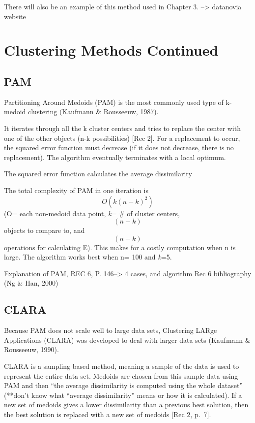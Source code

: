 \documentclass[12pt,twoside]{amherstthesis}
\begin{document}
  There will also be an example of this method used in Chapter 3.
  --\textgreater{} datanovia website
  
  \chapter{Clustering Methods Continued}\label{typeset-equ}
  
  \section{PAM}\label{pam}
  
  Partitioning Around Medoids (PAM) is the most commonly used type of
  k-medoid clustering (Kaufmann \& Rousseeuw, 1987).
  
  It iterates through all the k cluster centers and tries to replace the
  center with one of the other objects (n-k possibilities) {[}Rec 2{]}.
  For a replacement to occur, the squared error function must decrease (if
  it does not decrease, there is no replacement). The algorithm eventually
  terminates with a local optimum.
  
  The squared error function calculates the average dissimilarity
  
  The total complexity of PAM in one iteration is \[O(k(n-k)^2)\] (O= each
  non-medoid data point, \emph{k}= \# of cluster centers, \[(n-k)\]
  objects to compare to, and \[(n-k)\] operations for calculating E). This
  makes for a costly computation when n is large. The algorithm works best
  when n= 100 and \emph{k}=5.
  
  Explanation of PAM, REC 6, P. 146--\textgreater{} 4 cases, and algorithm
  Rec 6 bibliography (Ng \& Han, 2000)
  
  \section{CLARA}\label{clara}
  
  Because PAM does not scale well to large data sets, Clustering LARge
  Applications (CLARA) was developed to deal with larger data sets
  (Kaufmann \& Rousseeuw, 1990).
  
  CLARA is a sampling based method, meaning a sample of the data is used
  to represent the entire data set. Medoids are chosen from this sample
  data using PAM and then ``the average dissimilarity is computed using
  the whole dataset'' (**don't know what ``average dissimilarity'' means
  or how it is calculated). If a new set of medoids gives a lower
  dissimilarity than a previous best solution, then the best solution is
  replaced with a new set of medoids {[}Rec 2, p.~7{]}.
  
\end{document}
